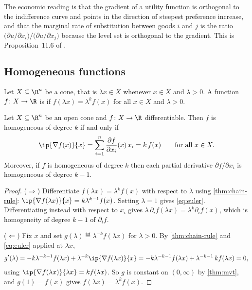 The economic reading is that the gradient of a utility function is orthogonal to
the indifference curve and points in the direction of steepest preference
increase, and that the marginal rate of substitution between goods $i$ and $j$ is
the ratio $\bigl(\partial u/\partial x_i\bigr)\big/\bigl(\partial u/\partial
	x_j\bigr)$ because the level set is orthogonal to the gradient. This is
Proposition~11.6 of \textcite[p.~385]{fukuda2026notes}.

\subsection{Homogeneous functions}

\begin{definition}[Homogeneity]\label{def:homogeneous}
	Let $X\subseteq\R^n$ be a cone, that is $\lambda x\in X$ whenever $x\in X$ and
	$\lambda>0$. A function $f\colon X\to\R$ is  if $f(\lambda x)=\lambda^kf(x)$ for all $x\in X$ and
	$\lambda>0$.
\end{definition}

\begin{theorem}[Euler]\label{thm:euler-homogeneous}
	Let $X\subseteq\R^n$ be an open cone and $f\colon X\to\R$ differentiable. Then
	$f$ is homogeneous of degree $k$ if and only if
	\begin{equation}\label{eq:euler}
		\ip{\nabla f(x)}{x}=\sum_{i=1}^{n}\frac{\partial f}{\partial x_i}(x)\,x_i
		=k\,f(x)\qquad\text{for all }x\in X .
	\end{equation}
	Moreover, if $f$ is homogeneous of degree $k$ then each partial derivative
	$\partial f/\partial x_i$ is homogeneous of degree $k-1$.
\end{theorem}

\begin{proof}
	($\Rightarrow$) Differentiate $f(\lambda x)=\lambda^kf(x)$ with respect to
	$\lambda$ using \autoref{thm:chain-rule}:
	$\ip{\nabla f(\lambda x)}{x}=k\lambda^{k-1}f(x)$. Setting $\lambda=1$ gives
	\eqref{eq:euler}. Differentiating instead with respect to $x_i$ gives
	$\lambda\,\partial_if(\lambda x)=\lambda^k\partial_if(x)$, which is homogeneity
	of degree $k-1$ of $\partial_if$.

	($\Leftarrow$) Fix $x$ and set $g(\lambda)\eqdef\lambda^{-k}f(\lambda x)$ for
	$\lambda>0$. By \autoref{thm:chain-rule} and \eqref{eq:euler} applied at
	$\lambda x$,
	\[
		g'(\lambda)=-k\lambda^{-k-1}f(\lambda x)+\lambda^{-k}\ip{\nabla f(\lambda x)}{x}
		=-k\lambda^{-k-1}f(\lambda x)+\lambda^{-k-1}\,k f(\lambda x)=0 ,
	\]
	using $\ip{\nabla f(\lambda x)}{\lambda x}=kf(\lambda x)$. So $g$ is constant
	on $(0,\infty)$ by \autoref{thm:mvt}, and $g(1)=f(x)$ gives
	$f(\lambda x)=\lambda^kf(x)$.
\end{proof}

